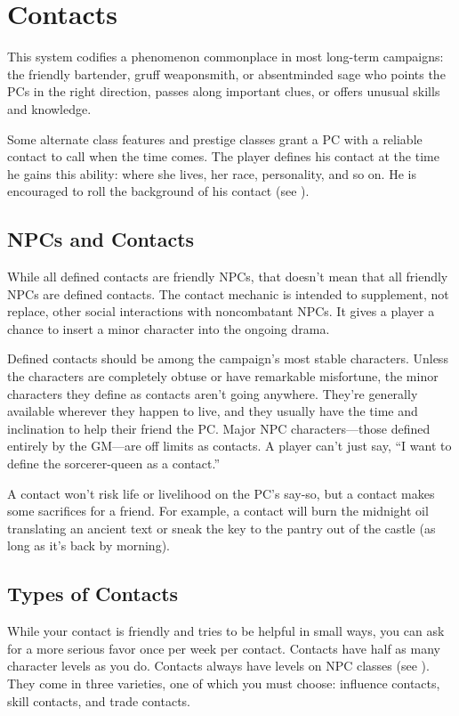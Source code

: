 \section{Contacts}
\label{sec:contacts}
This system codifies a phenomenon commonplace in most long-term campaigns: the friendly bartender, gruff weaponsmith, or absentminded sage who points the PCs in the right direction, passes along important clues, or offers unusual skills and knowledge.

Some alternate class features and prestige classes grant a PC with a reliable contact to call when the time comes. The player defines his contact at the time he gains this ability: where she lives, her race, personality, and so on. He is encouraged to roll the background of his contact (see ).

\subsection{NPCs and Contacts}
While all defined contacts are friendly NPCs, that doesn't mean that all friendly NPCs are defined contacts. The contact mechanic is intended to supplement, not replace, other social interactions with noncombatant NPCs. It gives a player a chance to insert a minor character into the ongoing drama.

Defined contacts should be among the campaign's most stable characters. Unless the characters are completely obtuse or have remarkable misfortune, the minor characters they define as contacts aren't going anywhere. They're generally available wherever they happen to live, and they usually have the time and inclination to help their friend the PC. Major NPC characters---those defined entirely by the GM---are off limits as contacts. A player can't just say, ``I want to define the sorcerer-queen as a contact.''

A contact won't risk life or livelihood on the PC's say-so, but a contact makes some sacrifices for a friend. For example, a contact will burn the midnight oil translating an ancient text or sneak the key to the pantry out of the castle (as long as it's back by morning).

\subsection{Types of Contacts}
While your contact is friendly and tries to be helpful in small ways, you can ask for a more serious favor once per week per contact. Contacts have half as many character levels as you do. Contacts always have levels on NPC classes (see ). They come in three varieties, one of which you must choose: influence contacts, skill contacts, and trade contacts.

